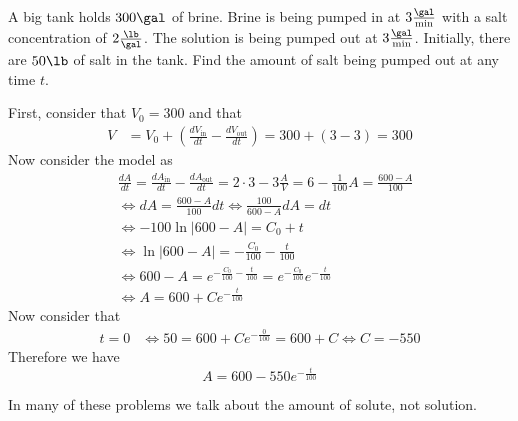\documentclass[notes]{subfiles}
\begin{document}
\begin{exercise}
    A big tank holds $300\us{\gal}$ of brine. Brine is being pumped in at $3\frac{\us{\gal}}{\si{\min}}$ with a salt concentration of $2\frac{\us{\lb}}{\us{\gal}}$. The solution is being pumped out at $3\frac{\us{\gal}}{\si{\min}}$. Initially, there are $50\us{\lb}$ of salt in the tank. Find the amount of salt being pumped out at any time $t$.
\end{exercise}
\begin{solution}
    First, consider that $V_0 = 300$ and that
    \begin{align*}
        V
        &= V_0 + \left( \frac{dV_{\mathrm{in}}}{dt} - \frac{dV_{\mathrm{out}}}{dt} \right)
        = 300 + (3 - 3)
        = 300
    \end{align*}
    Now consider the model as
    \begin{align*}
        &\frac{dA}{dt}
        = \frac{dA_{\mathrm{in}}}{dt} - \frac{dA_{\mathrm{out}}}{dt}
        = 2\cdot 3 - 3 \frac{A}{V}
        = 6 - \frac{1}{100}A
        = \frac{600 - A}{100} \\
        &\iff dA = \frac{600 - A}{100}dt
        \iff \frac{100}{600 - A}dA = dt \\
        &\iff -100\ln|600 - A| = C_0 + t \\
        &\iff \ln|600 - A| = -\frac{C_0}{100} - \frac{t}{100} \\
        &\iff 600 - A = e^{-\frac{C_0}{100} - \frac{t}{100}} = e^{-\frac{C_0}{100}}e^{-\frac{t}{100}} \\
        &\iff A = 600 + Ce^{-\frac{t}{100}}
    \end{align*}
    Now consider that
    \begin{align*}
        t = 0
        &\iff 50 = 600 + Ce^{-\frac{0}{100}} = 600 + C
        \iff C = -550
    \end{align*}
    Therefore we have
    \[
        A = 600 - 550e^{-\frac{t}{100}}
    \]
\end{solution}
In many of these problems we talk about the amount of solute, not solution.
\end{document}
